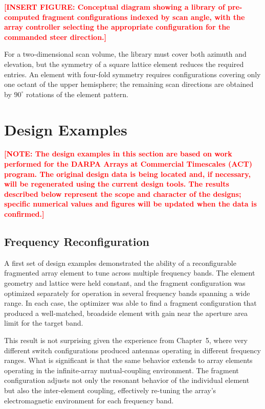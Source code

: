 \textcolor{red}{\textbf{[INSERT FIGURE: Conceptual diagram showing a library of pre-computed fragment configurations indexed by scan angle, with the array controller selecting the appropriate configuration for the commanded steer direction.]}}

For a two-dimensional scan volume, the library must cover both azimuth and elevation, but the symmetry of a square lattice element reduces the required entries.  An element with four-fold symmetry requires configurations covering only one octant of the upper hemisphere; the remaining scan directions are obtained by $90^{\circ}$ rotations of the element pattern.

\section{Design Examples}

\textcolor{red}{\textbf{[NOTE: The design examples in this section are based on work performed for the DARPA Arrays at Commercial Timescales (ACT) program.  The original design data is being located and, if necessary, will be regenerated using the current design tools.  The results described below represent the scope and character of the designs; specific numerical values and figures will be updated when the data is confirmed.]}}

\subsection{Frequency Reconfiguration}

A first set of design examples demonstrated the ability of a reconfigurable fragmented array element to tune across multiple frequency bands.  The element geometry and lattice were held constant, and the fragment configuration was optimized separately for operation in several frequency bands spanning a wide range.  In each case, the optimizer was able to find a fragment configuration that produced a well-matched, broadside element with gain near the aperture area limit for the target band.

This result is not surprising given the experience from Chapter~5, where very different switch configurations produced antennas operating in different frequency ranges.  What is significant is that the same behavior extends to array elements operating in the infinite-array mutual-coupling environment.  The fragment configuration adjusts not only the resonant behavior of the individual element but also the inter-element coupling, effectively re-tuning the array's electromagnetic environment for each frequency band.

